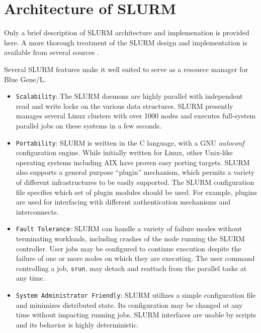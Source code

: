 \documentclass[10pt,onecolumn,times]{../common/llncs}
\begin{document}
{\section{Architecture of SLURM}

Only a brief description of SLURM architecture and implemenation is provided 
here. 
A more thorough treatment of the SLURM design and implementation is 
available from several sources \cite{SLURM2003,SlurmWeb}.

Several SLURM features make it well suited to serve as a resource manager 
for Blue Gene/L.

\begin{itemize}

\item {\tt Scalability}: 
The SLURM daemons are highly parallel  with independent read and write 
locks on the various data structures. 
SLURM presently manages several Linux clusters with over 1000 nodes 
and executes full-system parallel jobs on these systems in a few seconds.

\item {\tt Portability}: 
SLURM is written in the C language, with a GNU {\em autoconf} configuration engine.  
While initially written for Linux, other Unix-like operating systems including 
AIX have proven easy porting targets.
SLURM also supports a general purpose ``plugin'' mechanism, which 
permits a variety of different infrastructures to be easily supported.
The SLURM configuration file specifies which set of plugin modules 
should be used. 
For example, plugins are used for interfacing with different authentication 
mechanisms and interconnects.

\item {\tt Fault Tolerance}: SLURM can handle a variety of failure
modes without terminating workloads, including crashes of the node
running the SLURM controller.  User jobs may be configured to continue
execution despite the failure of one or more nodes on which they are
executing.  The user command controlling a job, {\tt srun}, may detach
and reattach from the parallel tasks at any time.  

\item {\tt System Administrator Friendly}: SLURM utilizes
a simple configuration file and minimizes distributed state.
Its configuration may be changed at any time without impacting running
jobs.  SLURM interfaces are usable by scripts and its behavior is 
highly deterministic.

\end{itemize}

}
\end{document}
